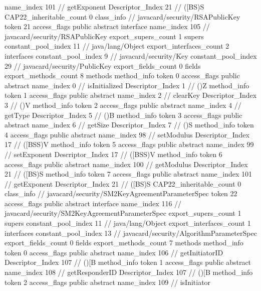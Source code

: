 {{{{{					name_index	101		// getExponent
					Descriptor_Index	21		// ([BS)S
				}
			}
			CAP22_inheritable_count	0
		}
		class_info {		// javacard/security/RSAPublicKey
			token	21
			access_flags	public abstract interface
			name_index	105		// javacard/security/RSAPublicKey
			export_supers_count	1
			supers {
				constant_pool_index	11		// java/lang/Object
			}
			export_interfaces_count	2
			interfaces {
				constant_pool_index	9		// javacard/security/Key
				constant_pool_index	29		// javacard/security/PublicKey
			}
			export_fields_count	0
			fields {
			}
			export_methods_count	8
			methods {
				method_info {
					token	0
					access_flags	public abstract
					name_index	0		// isInitialized
					Descriptor_Index	1		// ()Z
				}
				method_info {
					token	1
					access_flags	public abstract
					name_index	2		// clearKey
					Descriptor_Index	3		// ()V
				}
				method_info {
					token	2
					access_flags	public abstract
					name_index	4		// getType
					Descriptor_Index	5		// ()B
				}
				method_info {
					token	3
					access_flags	public abstract
					name_index	6		// getSize
					Descriptor_Index	7		// ()S
				}
				method_info {
					token	4
					access_flags	public abstract
					name_index	98		// setModulus
					Descriptor_Index	17		// ([BSS)V
				}
				method_info {
					token	5
					access_flags	public abstract
					name_index	99		// setExponent
					Descriptor_Index	17		// ([BSS)V
				}
				method_info {
					token	6
					access_flags	public abstract
					name_index	100		// getModulus
					Descriptor_Index	21		// ([BS)S
				}
				method_info {
					token	7
					access_flags	public abstract
					name_index	101		// getExponent
					Descriptor_Index	21		// ([BS)S
				}
			}
			CAP22_inheritable_count	0
		}
		class_info {		// javacard/security/SM2KeyAgreementParameterSpec
			token	22
			access_flags	public abstract interface
			name_index	116		// javacard/security/SM2KeyAgreementParameterSpec
			export_supers_count	1
			supers {
				constant_pool_index	11		// java/lang/Object
			}
			export_interfaces_count	1
			interfaces {
				constant_pool_index	13		// javacard/security/AlgorithmParameterSpec
			}
			export_fields_count	0
			fields {
			}
			export_methods_count	7
			methods {
				method_info {
					token	0
					access_flags	public abstract
					name_index	106		// getInitiatorID
					Descriptor_Index	107		// ()[B
				}
				method_info {
					token	1
					access_flags	public abstract
					name_index	108		// getResponderID
					Descriptor_Index	107		// ()[B
				}
				method_info {
					token	2
					access_flags	public abstract
					name_index	109		// isInitiator
}}}}}
